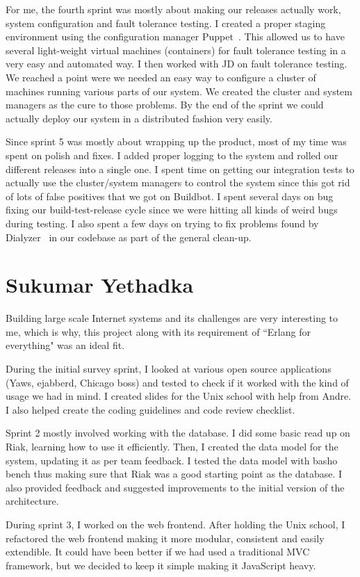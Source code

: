 \documentclass[11pt,a4paper]{report}
\begin{document}
For me, the fourth sprint was mostly about making our releases actually work,
system configuration and fault tolerance testing. I created a proper staging
environment using the configuration manager Puppet~\cite{puppetlab}. This allowed us to have
several light-weight virtual machines (containers) for fault tolerance testing
in a very easy and automated way. I then worked with JD on fault
tolerance testing. We reached a point were we needed an easy way to configure a
cluster of machines running various parts of our system. We created the cluster
and system managers as the cure to those problems. By the end of the sprint we
could actually deploy our system in a distributed fashion very easily.

Since sprint 5 was mostly about wrapping up the product, most of my time was
spent on polish and fixes. I added proper logging to the system and rolled our
different releases into a single one. I spent time on getting our integration
tests to actually use the cluster/system managers to control the system since
this got rid of lots of false positives that we got on Buildbot. I spent several
days on bug fixing our build-test-release cycle since we were hitting all kinds
of weird bugs during testing. I also spent a few days on trying to fix problems
found by Dialyzer~\cite{dialyzer} in our codebase as part of the general clean-up.
\section{Sukumar Yethadka}
Building large scale Internet systems and its challenges are very interesting to
me, which is why, this project along with its requirement of ``Erlang for
everything" was an ideal fit.

During the initial survey sprint, I looked at various open source applications
(Yaws, ejabberd, Chicago boss) and tested to check if it worked with the kind of
usage we had in mind. I created slides for the Unix school with help from
Andre. I also helped create the coding guidelines and code review checklist.

Sprint 2 mostly involved working with the database. I did some basic read up on
Riak, learning how to use it efficiently. Then, I created the data model for the
system, updating it as per team feedback. I tested the data model with basho
bench thus making sure that Riak was a good starting point as the database. I
also provided feedback and suggested improvements to the initial version of the
architecture.

During sprint 3, I worked on the web frontend. After holding the Unix school, I
refactored the web frontend making it more modular, consistent and easily
extendible. It could have been better if we had used a traditional MVC
framework, but we decided to keep it simple making it JavaScript heavy.
\end{document}
